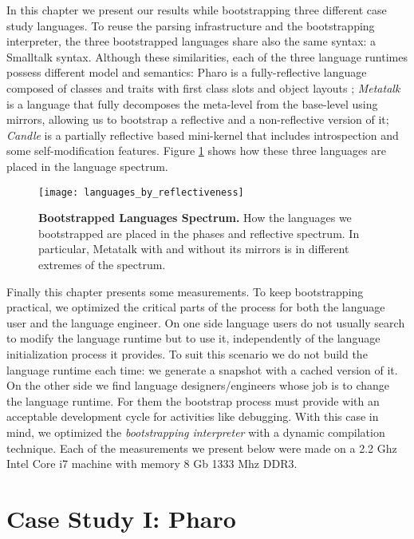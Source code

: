 In this chapter we present our results while bootstrapping three different case study languages.
To reuse the parsing infrastructure and the bootstrapping interpreter, the three bootstrapped languages share also the same syntax: a Smalltalk syntax. Although these similarities, each of the three language runtimes possess different model and semantics: Pharo is a fully-reflective language composed of classes and traits with first class slots and object layouts \cite{Verw11a}; \emph{Metatalk}~\cite{Papo11a} is a language that fully decomposes the meta-level from the base-level using mirrors, allowing us to bootstrap a reflective and a non-reflective version of it; \emph{Candle} is a partially reflective  based mini-kernel that includes introspection and some self-modification features. Figure \ref{fig:languages_spectrum} shows how these three languages are placed in the language spectrum.%

\begin{figure}[ht]
\center
\texttt{[image: languages\_by\_reflectiveness]}
\caption{\textbf{Bootstrapped Languages Spectrum.} How the languages we bootstrapped are placed in the phases and reflective spectrum. In particular, Metatalk with and without its mirrors is in different extremes of the spectrum.\label{fig:languages_spectrum}}
\end{figure}

Finally this chapter presents some measurements. To keep bootstrapping practical, we optimized the critical parts of the process for both the language user and the language engineer. On one side language users do not usually search to modify the language runtime but to use it, independently of the language initialization process it provides. To suit this scenario we do not build the language runtime each time: we generate a snapshot with a cached version of it. On the other side we find language designers/engineers whose job is to change the language runtime. For them the bootstrap process must provide with an acceptable development cycle for activities like debugging. With this case in mind, we optimized the \emph{bootstrapping interpreter} with a dynamic compilation technique. Each of the measurements we present below were made on a 2.2 Ghz Intel Core i7 machine with memory 8 Gb 1333 Mhz DDR3.

\section{Case Study I: Pharo}\label{sec:bootstrap_pharo}

